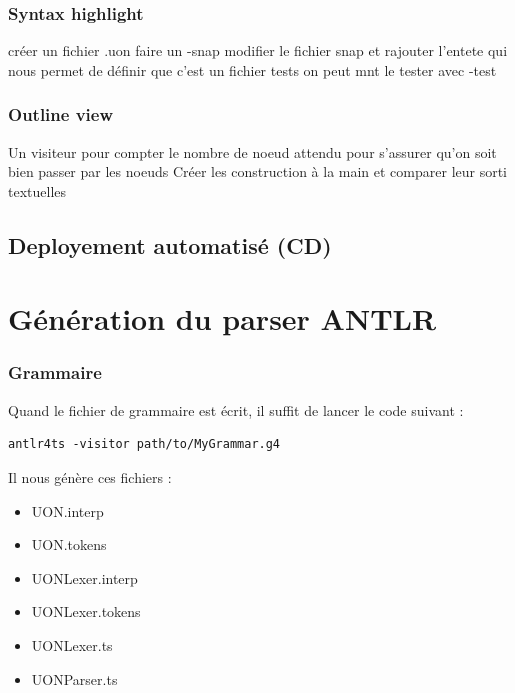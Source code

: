 \documentclass[
    iict, %
    il, %
]{heig-tb}
\begin{document}
\subsubsection{Syntax highlight}
créer un fichier .uon
faire un -snap
modifier le fichier snap et rajouter l'entete qui nous permet de définir que c'est un fichier tests
on peut mnt le tester avec -test


\subsubsection{Outline view}
Un visiteur pour compter le nombre de noeud attendu pour s'assurer qu'on soit bien passer par les noeuds
Créer les construction à la main et comparer leur sorti textuelles



\subsection{Deployement automatisé (CD)}




\section{Génération du parser ANTLR}
\subsubsection{Grammaire}

Quand le fichier de grammaire est écrit, il suffit de lancer le code suivant :

\begin{lstlisting}[frame=single]
    antlr4ts -visitor path/to/MyGrammar.g4
\end{lstlisting}

Il nous génère ces fichiers :
\begin{itemize}
    \item UON.interp
    \item UON.tokens
    \item UONLexer.interp
    \item UONLexer.tokens
    \item UONLexer.ts
    \item UONParser.ts
\end{itemize}
\end{document}
